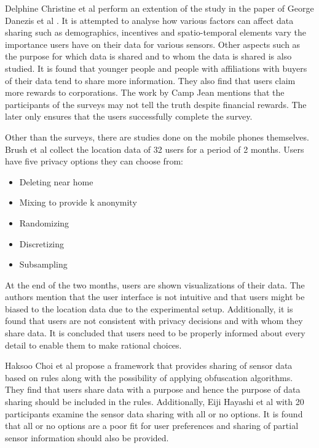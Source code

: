 Delphine Christine et al \cite{christin2013s} perform an extention of the study in the paper of George Danezis et al \cite{danezis2005much}. It is attempted to analyse how various factors can affect data sharing such as demographics, incentives and spatio-temporal elements vary the importance users have on their data for various sensors. Other aspects such as the purpose for which data is shared and to whom the data is shared is also studied. It is found that younger people and people with affiliations with buyers of their data tend to share more information. They also find that users claim more rewards to corporations. The work by Camp Jean \cite{camp2005state} mentions that the participants of the surveys may not tell the truth despite financial rewards. The later only ensures that the users successfully complete the survey.

Other than the surveys, there are studies done on the mobile phones themselves. Brush et al \cite{brush2010exploring} collect the location data of 32 users for a period of 2 months. Users have five privacy options they can choose from:

\begin{itemize}
\item Deleting near home
\item Mixing to provide k anonymity
\item Randomizing
\item Discretizing
\item Subsampling
\end{itemize}

At the end of the two months, users are shown visualizations of their data. The authors mention that the user interface is not intuitive and that users might be biased to the location data due to the experimental setup. Additionally, it is found that users are not consistent with privacy decisions and with whom they share data. It is concluded that users need to be properly informed about every detail to enable them to make rational choices.

Haksoo Choi et al \cite{choi2011sensorsafe} propose a framework that provides sharing of sensor data based on rules along with the possibility of applying obfuscation algorithms. They find that users share data with a purpose and hence the purpose of data sharing should be included in the rules. Additionally, Eiji Hayashi et al \cite{hayashi2012goldilocks} with 20 participants examine the sensor data sharing with all or no options. It is found that all or no options are a poor fit for user preferences and sharing of partial sensor information should also be provided.

